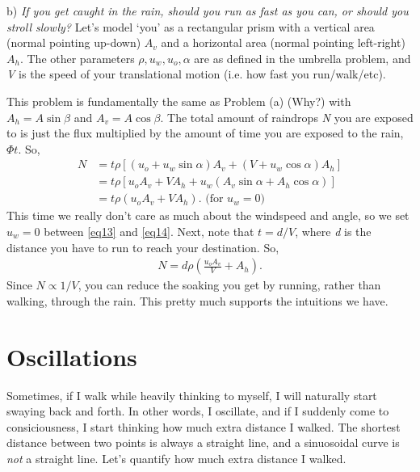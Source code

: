 \documentclass[11pt]{article}
\begin{document}
\vspace{10pt} b) \textit{If you get caught in the rain, should you run as fast as you can, or should you stroll slowly?} Let's model `you' as a rectangular prism with a vertical area (normal pointing up-down) $A_v$ and a horizontal area (normal pointing left-right) $A_h$. The other parameters $\rho, u_w, u_o, \alpha$ are as defined in the umbrella problem, and \textit{V} is the speed of your translational motion (i.e. how fast you run/walk/etc). %

\vspace{10pt} This problem is fundamentally the same as Problem (a) (Why?) with $A_h = A \sin{\beta}$ and $A_v = A \cos{\beta}$. The total amount of raindrops \textit{N} you are exposed to is just the flux multiplied by the amount of time you are exposed to the rain, $\Phi t$. So,
\begin{align} 
N &= t\rho[(u_o + u_w \sin{\alpha})A_v + (V + u_w \cos{\alpha})A_h] \nonumber \\
&= t \rho [u_o A_v + V A_h + u_w (A_v \sin{\alpha} + A_h \cos{\alpha})] \label{eq13}\\
&= t \rho (u_o A_v + V A_h).    \text{ (for $u_w = 0$)}\label{eq14}
\end{align}
This time we really don't care as much about the windspeed and angle, so we set $u_w = 0$ between \eqref{eq13} and \eqref{eq14}. Next, note that $t = d/V$, where \textit{d} is the distance you have to run to reach your destination. So,
\begin{align} \label{eq15}
N = d \rho \left( \frac{u_o A_v}{V} + A_h \right).
\end{align}
Since $N \propto 1/V$, you can reduce the soaking you get by running, rather than walking, through the rain. This pretty much supports the intuitions we have.

\section{Oscillations}
Sometimes, if I walk while heavily thinking to myself, I will naturally start swaying back and forth. In other words, I oscillate, and if I suddenly come to consiciousness, I start thinking how much extra distance I walked. The shortest distance between two points is always a straight line, and a sinuosoidal curve is \textit{not} a straight line. Let's quantify how much extra distance I walked.
\end{document}
